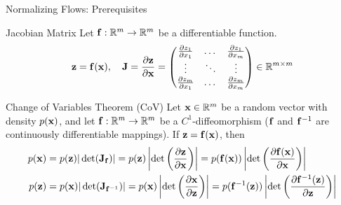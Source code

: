 \documentclass{beamer}
\renewcommand{\eqpause}{}
\renewcommand{\nextonslide}[1]{#1}
\begin{document}
\begin{frame}{Normalizing Flows: Prerequisites}
	\begin{block}{Jacobian Matrix}
		Let $\mathbf{f}: \mathbb{R}^m \rightarrow \mathbb{R}^m$ be a differentiable function.
		\[
			\mathbf{z} = \mathbf{f}(\mathbf{x}), \quad 
			\mathbf{J} =  \frac{\partial \mathbf{z}}{\partial \mathbf{x}} =
			\begin{pmatrix}
				\frac{\partial z_1}{\partial x_1} & \dots & \frac{\partial z_1}{\partial x_m} \\
				\vdots & \ddots & \vdots \\ 
				\frac{\partial z_m}{\partial x_1} & \dots & \frac{\partial z_m}{\partial x_m}
			\end{pmatrix} \in \mathbb{R}^{m \times m}
		\]
		\vspace{-0.3cm}
	\end{block}
    \eqpause
	\begin{block}{Change of Variables Theorem (CoV)}
		Let $\mathbf{x}\in \mathbb{R}^m$ be a random vector with density $p(\mathbf{x})$, and let $\mathbf{f}: \mathbb{R}^m \rightarrow \mathbb{R}^m$ be a $C^1$-diffeomorphism ($\mathbf{f}$ and $\mathbf{f}^{-1}$ are continuously differentiable mappings). 
		If $\mathbf{z} = \mathbf{f}(\mathbf{x})$, then
		\begin{align*}
			p(\bx) &= p(\bz) |\det(\bJ_{\bff})| = p(\bz) \left|\det \left( \frac{\partial \bz}{\partial \bx} \right) \right| 
			\nextonslide{= p(\bff(\bx)) \left|\det \left(  \frac{\partial \bff(\bx)}{\partial \bx} \right) \right|} \\
			\nextonslide{p(\bz) &= p(\bx) |\det(\bJ_{\bff^{-1}})| = p(\bx) \left|\det \left(  \frac{\partial \bx}{\partial \bz} \right) \right| 
			= p(\bff^{-1}(\bz)) \left|\det \left(  \frac{\partial \bff^{-1}(\bz)}{\partial \bz} \right) \right| }
		\end{align*}
		\vspace{-0.5cm}
	\end{block}
\end{frame}
\end{document}
